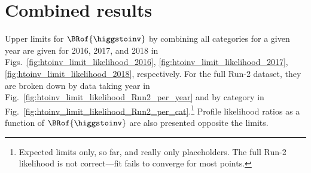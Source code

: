

\section{Combined results}
\label{sec:htoinv_combined_results}


Upper limits for $\BRof{\higgstoinv}$ by combining all categories for a given year are given for 2016, 2017, and 2018 in Figs.~\ref{fig:htoinv_limit_likelihood_2016}, \ref{fig:htoinv_limit_likelihood_2017}, \ref{fig:htoinv_limit_likelihood_2018}, respectively. For the full Run-2 dataset, they are broken down by data taking year in Fig.~\ref{fig:htoinv_limit_likelihood_Run2_per_year} and by category in Fig.~\ref{fig:htoinv_limit_likelihood_Run2_per_cat}.\footnote{Expected limits only, so far, and really only placeholders. The full Run-2 likelihood is not correct---fit fails to converge for most points.} Profile likelihood ratios as a function of $\BRof{\higgstoinv}$ are also presented opposite the limits.


